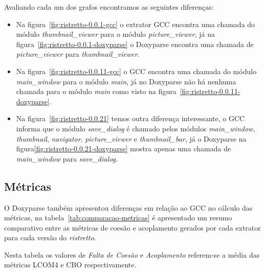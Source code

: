 Avaliando cada um dos grafos encontramos as seguintes diferenças:

\begin{itemize}

\item Na figura~\ref{fig:ristretto-0.0.1-gcc} o extrator GCC encontra uma
chamada do módulo {\it thumbnail\_viewer} para o módulo {\it picture\_viewer},
já na figura~\ref{fig:ristretto-0.0.1-doxyparse} o Doxyparse encontra uma
chamada de {\it picture\_viewer} para {\it thumbnail\_viewer}.

\item Na figura~\ref{fig:ristretto-0.0.11-gcc} o GCC encontra uma chamada do
módulo {\it main\_window} para o módulo {\it main}, já no Doxyparse não há
nenhuma chamada para o módulo {\it main} como visto na
figura~\ref{fig:ristretto-0.0.11-doxyparse}. 

\item Na figura~\ref{fig:ristretto-0.0.21} temos outra diferença interessante,
o GCC informa que o módulo {\it save\_dialog} é chamado pelos módulos {\it
main\_window}, {\it thumbnail}, {\it navigator}, {\it picture\_viewer} e {\it
thumbnail\_bar}, já o Doxyparse na figura\ref{fig:ristretto-0.0.21-doxyparse}
mostra apenas uma chamada de {\it main\_window} para {\it save\_dialog}.

\end{itemize}

\subsection{Métricas}

O Doxyparse também apresentou diferenças em relação ao GCC no cálculo das
métricas, na tabela~\ref{tab:comparacao-metricas} é apresentado um resumo
comparativo entre as métricas de coesão e acoplamento gerados por cada extrator
para cada versão do {\it ristretto}.

Nesta tabela os valores de {\it Falta de Coesão} e {\it Acoplamento} referem-se
a média das métricas LCOM4 e CBO respectivamente.

